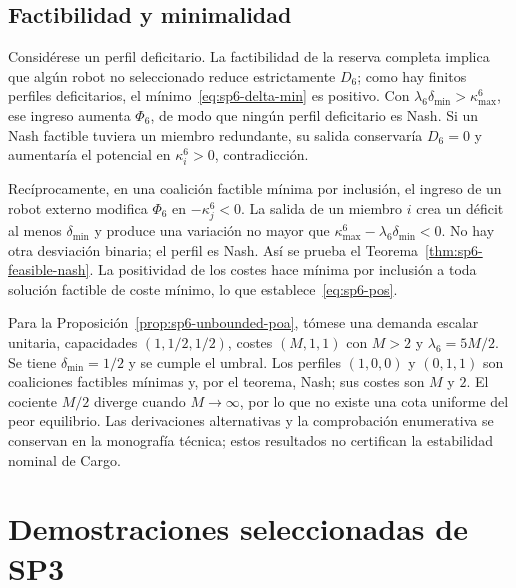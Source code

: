 \subsection{Factibilidad y minimalidad}
\label{app:sp6-feasible-nash-proof}

Considérese un perfil deficitario. La factibilidad de la reserva completa implica que algún robot no seleccionado reduce estrictamente $D_6$; como hay finitos perfiles deficitarios, el mínimo~\eqref{eq:sp6-delta-min} es positivo. Con $\lambda_6\delta_{\min}>\kappa_{\max}^6$, ese ingreso aumenta $\Phi_6$, de modo que ningún perfil deficitario es Nash. Si un Nash factible tuviera un miembro redundante, su salida conservaría $D_6=0$ y aumentaría el potencial en $\kappa_i^6>0$, contradicción.

Recíprocamente, en una coalición factible mínima por inclusión, el ingreso de un robot externo modifica $\Phi_6$ en $-\kappa_j^6<0$. La salida de un miembro $i$ crea un déficit al menos $\delta_{\min}$ y produce una variación no mayor que $\kappa_{\max}^6-\lambda_6\delta_{\min}<0$. No hay otra desviación binaria; el perfil es Nash. Así se prueba el Teorema~\ref{thm:sp6-feasible-nash}. La positividad de los costes hace mínima por inclusión a toda solución factible de coste mínimo, lo que establece~\eqref{eq:sp6-pos}.

Para la Proposición~\ref{prop:sp6-unbounded-poa}, tómese una demanda escalar unitaria, capacidades $(1,1/2,1/2)$, costes $(M,1,1)$ con $M>2$ y $\lambda_6=5M/2$. Se tiene $\delta_{\min}=1/2$ y se cumple el umbral. Los perfiles $(1,0,0)$ y $(0,1,1)$ son coaliciones factibles mínimas y, por el teorema, Nash; sus costes son $M$ y $2$. El cociente $M/2$ diverge cuando $M\to\infty$, por lo que no existe una cota uniforme del peor equilibrio. Las derivaciones alternativas y la comprobación enumerativa se conservan en la monografía técnica; estos resultados no certifican la estabilidad nominal de Cargo.

\section{Demostraciones seleccionadas de SP3}
\label{app:sp3-all-proofs}


